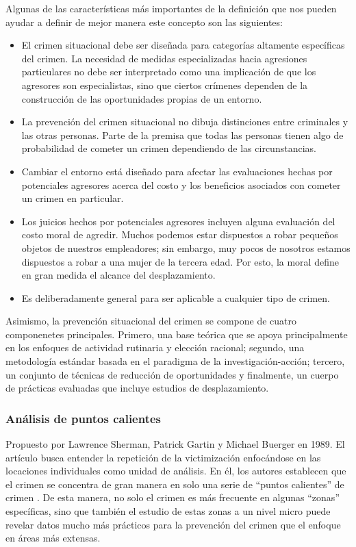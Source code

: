 Algunas de las características más importantes de la definición que nos pueden ayudar a definir de mejor manera este concepto son las siguientes\cite{clarke1997}:

\begin{itemize}
    \item El crimen situacional debe ser diseñada para categorías altamente específicas del crimen. La necesidad de medidas especializadas hacia agresiones particulares no debe ser interpretado como una implicación de que los agresores son especialistas, sino que ciertos crímenes dependen de la construcción de las oportunidades propias de un entorno.
    \item La prevención del crimen situacional no dibuja distinciones entre criminales y las otras personas. Parte de la premisa que todas las personas tienen algo de probabilidad de cometer un crimen dependiendo de las circunstancias.
    \item Cambiar el entorno está diseñado para afectar las evaluaciones hechas por potenciales agresores acerca del costo y los beneficios asociados con cometer un crimen en particular.
    \item Los juicios hechos por potenciales agresores incluyen alguna evaluación del costo moral de agredir. Muchos podemos estar dispuestos a robar pequeños objetos de nuestros empleadores; sin embargo, muy pocos de nosotros estamos dispuestos a robar a una mujer de la tercera edad. Por esto, la moral define en gran medida el alcance del desplazamiento.
    \item Es deliberadamente general para ser aplicable a cualquier tipo de crimen.
\end{itemize}

Asimismo, la prevención situacional del crimen se compone de cuatro componenetes principales. Primero, una base teórica que se apoya principalmente en los enfoques de actividad rutinaria y elección racional; segundo, una metodología estándar basada en el paradigma de la investigación-acción; tercero, un conjunto de técnicas de reducción de oportunidades y finalmente, un cuerpo de prácticas evaluadas que incluye estudios de desplazamiento\cite{clarke1997}.

\subsubsection{Análisis de puntos calientes}
Propuesto por Lawrence Sherman, Patrick Gartin y Michael Buerger en 1989. El artículo busca entender la repetición de la victimización enfocándose en las locaciones individuales como unidad de análisis. En él, los autores establecen que el crimen se concentra de gran manera en solo una serie de ``puntos calientes'' de crimen \cite{sherman1989}. De esta manera, no solo el crimen es más frecuente en algunas ``zonas'' específicas, sino que también el estudio de estas zonas a un nivel micro puede revelar datos mucho más prácticos para la prevención del crimen que el enfoque en áreas más extensas.

